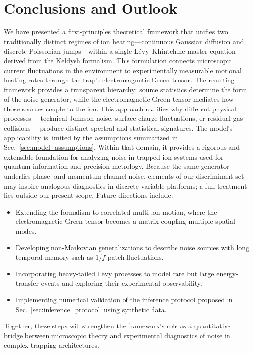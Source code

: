 \section{Conclusions and Outlook}
\label{sec:conclusion}

We have presented a first-principles theoretical framework that unifies
two traditionally distinct regimes of ion heating---continuous Gaussian diffusion
and discrete Poissonian jumps---within a single Lévy–Khintchine master equation
derived from the Keldysh formalism.
This formulation connects microscopic current fluctuations in the environment
to experimentally measurable motional heating rates through the trap's
electromagnetic Green tensor.
The resulting framework provides a transparent hierarchy:
source statistics determine the form of the noise generator,
while the electromagnetic Green tensor mediates how those sources couple to the ion.
This approach clarifies why different physical processes---
technical Johnson noise, surface charge fluctuations, or residual-gas collisions---
produce distinct spectral and statistical signatures.
The model's applicability is limited by the assumptions summarized in
Sec.~\ref{sec:model_assumptions}.
Within that domain, it provides a rigorous and extensible foundation
for analyzing noise in trapped-ion systems used for quantum information
and precision metrology.
Because the same generator underlies phase- and momentum-channel noise, elements of our discriminant set may inspire analogous diagnostics in discrete-variable platforms; a full treatment lies outside our present scope.
Future directions include:
\begin{itemize}
  \item Extending the formalism to correlated multi-ion motion,
        where the electromagnetic Green tensor becomes a matrix coupling multiple spatial modes.
  \item Developing non-Markovian generalizations to describe noise sources
        with long temporal memory such as \(1/f\) patch fluctuations.
  \item Incorporating heavy-tailed Lévy processes to model rare but large
        energy-transfer events and exploring their experimental observability.
  \item Implementing numerical validation of the inference protocol
        proposed in Sec.~\ref{sec:inference_protocol} using synthetic data.
\end{itemize}

Together, these steps will strengthen the framework's role as a quantitative bridge
between microscopic theory and experimental diagnostics of noise
in complex trapping architectures.
